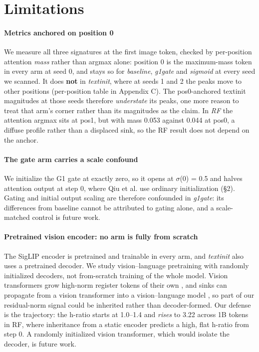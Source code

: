 \documentclass{article}
\begin{document}
\section{Limitations}

\paragraph{Metrics anchored on position 0} We measure all three signatures at the first image token, checked by per-position attention \textit{mass} rather than argmax alone: position 0 is the maximum-mass token in every arm at seed 0, and stays so for \textit{baseline}, \textit{g1gate} and \textit{sigmoid} at every seed we scanned. It does \textbf{not} in \textit{textinit}, where at seeds 1 and 2 the peaks move to other positions (per-position table in Appendix C). The pos0-anchored textinit magnitudes at those seeds therefore \textit{understate} its peaks, one more reason to treat that arm's corner rather than its magnitudes as the claim. In \textit{RF} the attention argmax sits at pos1, but with mass 0.053 against 0.044 at pos0, a diffuse profile rather than a displaced sink, so the RF result does not depend on the anchor.

\paragraph{The gate arm carries a scale confound} We initialize the G1 gate at exactly zero, so it opens at $\sigma$(0) = 0.5 and halves attention output at step 0, where Qiu et al. \cite{ref20} use ordinary initialization (\S2). Gating and initial output scaling are therefore confounded in \textit{g1gate}: its differences from baseline cannot be attributed to gating alone, and a scale-matched control is future work.

\paragraph{Pretrained vision encoder: no arm is fully from scratch} The SigLIP encoder is pretrained and trainable in every arm, and \textit{textinit} also uses a pretrained decoder. We study vision--language pretraining with randomly initialized decoders, not from-scratch training of the whole model. Vision transformers grow high-norm register tokens of their own \cite{ref25}, and sinks can propagate from a vision transformer into a vision--language model \cite{ref11}, so part of our residual-norm signal could be inherited rather than decoder-formed. Our defense is the trajectory: the h-ratio starts at 1.0--1.4 and \textit{rises} to 3.22 across 1B tokens in RF, where inheritance from a static encoder predicts a high, flat h-ratio from step 0. A randomly initialized vision transformer, which would isolate the decoder, is future work.
\end{document}
